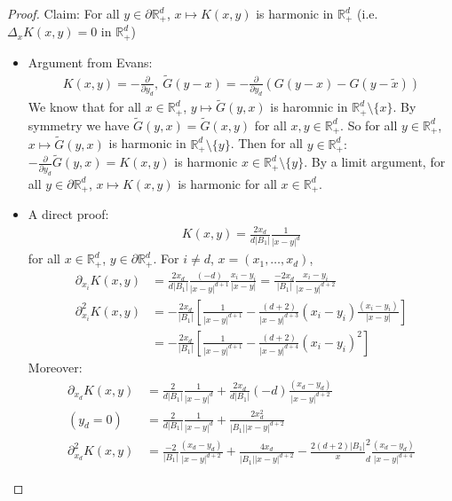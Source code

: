 \documentclass{report}
\theoremstyle{tommy}
\begin{document}
  \begin{proof}
    Claim: For all \(y \in \partial \mathbb{R}_+^d\), \(x \mapsto K(x,y)\) is harmonic in \(\mathbb{R}_+^d\) (i.e. \(\Delta_x K(x,y) = 0\) in \(\mathbb{R}_+^d\))
    \begin{itemize}
      \item Argument from Evans: \begin{align*}
        K(x,y) = - \frac{\partial}{\partial y_d}, \ \tilde G(y-x) = - \frac{\partial}{\partial y_d}(G(y-x)-G(y-\tilde x))
      \end{align*}
      We know that for all \(x \in \mathbb{R}_+^d\), \(y \mapsto \tilde G(y,x)\) is haromnic in \(\mathbb{R}_+^d \setminus \{x\}\). By symmetry we have \(\tilde G(y,x) = \tilde G(x,y)\) for all \(x,y \in \mathbb{R}^d_+\). So for all \(y \in \mathbb{R}_+^d\), \(x \mapsto \tilde G(y,x)\) is harmonic in \(\mathbb{R}_+^d \setminus \{y\}\). Then for all \(y \in \mathbb{R}_+^d:\) \(- \frac{\partial}{\partial y_d} \tilde G(y,x)= K(x,y)\) is harmonic \(x \in \mathbb{R}_+^d \setminus \{y\}\). By a limit argument, for all \(y \in \partial \mathbb{R}_+^d\), \(x \mapsto K(x,y)\) is harmonic for all \(x \in \mathbb{R}_+^d\).
      \item  A direct proof:
      \begin{align*}
        K(x,y) = \frac{2 x_d}{d |B_1|} \frac{1}{|x-y|^d}
      \end{align*}
      for all \(x \in \mathbb{R}_+^d\), \(y \in \partial \mathbb{R}_+^d\). For \(i \ne d\), \(x=(x_1, \dots, x_d)\), 
      \begin{align*}
        \partial_{x_i} K(x,y) &= \frac{2 x_d}{d |B_1|} \frac{(-d)}{|x-y|^{d+1}}\frac{x_i-y_i}{|x-y|} = \frac{-2x_d}{|B_1|}\frac{x_i - y_i}{|x-y|^{d+2}} \\
        \partial_{x_i}^2 K(x,y) &= - \frac{2 x_d}{|B_1|} \left[\frac{1}{|x-y|^{d+1}} - \frac{(d+2)}{|x-y|^{d+3}}(x_i-y_i) \frac{(x_i-y_i)}{|x-y|}\right] \\
        &= - \frac{2 x_d}{|B_1|} \left[\frac{1}{|x-y|^{d+1}} - \frac{(d+2)}{|x-y|^{d+4}}(x_i-y_i)^2\right]
      \end{align*}
      Moreover:
      \begin{align*}
        \partial_{x_d} K(x,y) 
        &= \frac{2}{d|B_1|} \frac{1}{|x-y|^d} + \frac{2 x_d}{d|B_1|}(-d) \frac{(x_d-y_d)}{|x-y|^{d+2}} \\
        (y_d = 0) \quad &= \frac{2}{d|B_1|} \frac{1}{|x-y|^d} + \frac{2x_d^2}{|B_1||x-y|^{d+2}} \\
        \partial_{x_d}^2K(x,y) &= \frac{-2}{|B_1|} \frac{(x_d-y_d)}{|x-y|^{d+2}} + \frac{4 x_d}{|B_1||x-y|^{d+2}} - \frac{2(d+2){|B_1|}} x_d^2 \frac{(x_d - y_d)}{|x-y|^{d+4}}

\end{align*}
\end{itemize}
\end{proof}
\end{document}
